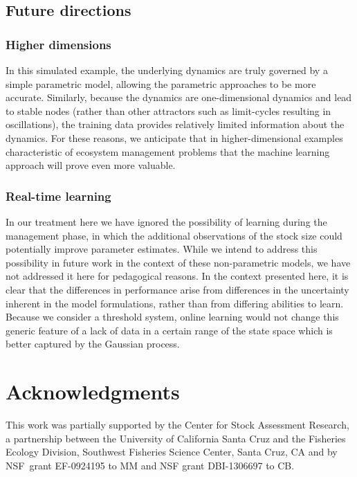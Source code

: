 \documentclass[author-year, review]{elsarticle} %
\begin{document}
\subsection{Future directions}\label{future-directions}

\subsubsection{Higher dimensions}\label{higher-dimensions}

In this simulated example, the underlying dynamics are truly governed by
a simple parametric model, allowing the parametric approaches to be more
accurate. Similarly, because the dynamics are one-dimensional dynamics
and lead to stable nodes (rather than other attractors such as
limit-cycles resulting in oscillations), the training data provides
relatively limited information about the dynamics. For these reasons, we
anticipate that in higher-dimensional examples characteristic of
ecosystem management problems that the machine learning approach will
prove even more valuable.

\subsubsection{Real-time learning}\label{real-time-learning}

In our treatment here we have ignored the possibility of learning during
the management phase, in which the additional observations of the stock
size could potentially improve parameter estimates. While we intend to
address this possibility in future work in the context of these
non-parametric models, we have not addressed it here for pedagogical
reasons. In the context presented here, it is clear that the differences
in performance arise from differences in the uncertainty inherent in the
model formulations, rather than from differing abilities to learn.
Because we consider a threshold system, online learning would not change
this generic feature of a lack of data in a certain range of the state
space which is better captured by the Gaussian process.

\section{Acknowledgments}\label{acknowledgments}

This work was partially supported by the Center for Stock Assessment
Research, a partnership between the University of California Santa Cruz
and the Fisheries Ecology Division, Southwest Fisheries Science Center,
Santa Cruz, CA and by NSF~grant EF-0924195 to MM and NSF grant
DBI-1306697 to CB.
\end{document}
